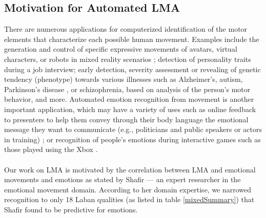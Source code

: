 \documentclass[11pt,twocolumn,varwidth=true,a4paper,fleqn]{article}
\begin{document}
\subsection{Motivation for Automated LMA}
There are numerous applications for computerized identification of the motor elements that characterize each possible human movement. Examples include the generation and control of specific expressive movements 
of avatars, virtual characters, or robots in mixed reality scenarios
\cite{Masuda}; detection of personality traits during a job interview; early detection, severity assessment 
or revealing of genetic tendency (phenotype) towards various illnesses such as Alzheimer's,
autism, Parkinson's disease \cite{camurri2003application}, or schizophrenia,
based on analysis of the person's motor behavior, and more. Automated emotion recognition from movement is another 
important application, which may have a variety of uses such as online feedback 
to presenters to help them convey through their body language the emotional message they want to communicate 
(e.g., politicians and public speakers or actors in training) \cite{nguyen2012online}; or recognition 
of people's emotions during interactive games such as those played using the Xbox \cite{Zacharatos}. 
\\\\Our work on LMA is motivated by the correlation between LMA and emotional movements and emotions as 
stated by Shafir --- an expert researcher in the emotional movement domain. According to her domain expertise, we narrowed recognition to only 18 Laban qualities (as listed in table \ref{mixedSummary}) that Shafir found to be predictive for emotions.
\end{document}
